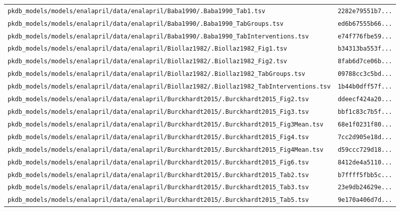 \documentclass{article}
\begin{document}
\begin{longtable}{ll}
\texttt{pkdb\_models/models/enalapril/data/enalapril/Baba1990/.Baba1990\_Tab1.tsv} & \texttt{2282e79551b7...} \\
\texttt{pkdb\_models/models/enalapril/data/enalapril/Baba1990/.Baba1990\_TabGroups.tsv} & \texttt{ed6b67555b66...} \\
\texttt{pkdb\_models/models/enalapril/data/enalapril/Baba1990/.Baba1990\_TabInterventions.tsv} & \texttt{e74f776fbe59...} \\
\texttt{pkdb\_models/models/enalapril/data/enalapril/Biollaz1982/.Biollaz1982\_Fig1.tsv} & \texttt{b34313ba553f...} \\
\texttt{pkdb\_models/models/enalapril/data/enalapril/Biollaz1982/.Biollaz1982\_Fig2.tsv} & \texttt{8fab6d7ce06b...} \\
\texttt{pkdb\_models/models/enalapril/data/enalapril/Biollaz1982/.Biollaz1982\_TabGroups.tsv} & \texttt{09788cc3c5bd...} \\
\texttt{pkdb\_models/models/enalapril/data/enalapril/Biollaz1982/.Biollaz1982\_TabInterventions.tsv} & \texttt{1b44b0dff57f...} \\
\texttt{pkdb\_models/models/enalapril/data/enalapril/Burckhardt2015/.Burckhardt2015\_Fig2.tsv} & \texttt{ddeecf424a20...} \\
\texttt{pkdb\_models/models/enalapril/data/enalapril/Burckhardt2015/.Burckhardt2015\_Fig3.tsv} & \texttt{bbf1c83c7b5f...} \\
\texttt{pkdb\_models/models/enalapril/data/enalapril/Burckhardt2015/.Burckhardt2015\_Fig3Mean.tsv} & \texttt{68e1f0231f80...} \\
\texttt{pkdb\_models/models/enalapril/data/enalapril/Burckhardt2015/.Burckhardt2015\_Fig4.tsv} & \texttt{7cc2d905e18d...} \\
\texttt{pkdb\_models/models/enalapril/data/enalapril/Burckhardt2015/.Burckhardt2015\_Fig4Mean.tsv} & \texttt{d59ccc729d18...} \\
\texttt{pkdb\_models/models/enalapril/data/enalapril/Burckhardt2015/.Burckhardt2015\_Fig6.tsv} & \texttt{8412de4a5110...} \\
\texttt{pkdb\_models/models/enalapril/data/enalapril/Burckhardt2015/.Burckhardt2015\_Tab2.tsv} & \texttt{b7ffff5fbb5c...} \\
\texttt{pkdb\_models/models/enalapril/data/enalapril/Burckhardt2015/.Burckhardt2015\_Tab3.tsv} & \texttt{23e9db24629e...} \\
\texttt{pkdb\_models/models/enalapril/data/enalapril/Burckhardt2015/.Burckhardt2015\_Tab5.tsv} & \texttt{9e170a406d7d...} \\

\end{longtable}
\end{document}
